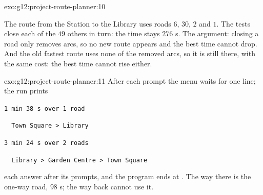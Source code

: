 \begin{solution}{exo:g12:project-route-planner:10}
\smallskip\noindent\hspace*{2em}

\noindent\hspace*{4em}

\noindent\hspace*{4em}

\noindent\hspace*{6em}

\noindent\hspace*{10em}

\noindent\hspace*{6em}

\noindent\hspace*{4em}

\smallskip\noindent The route from the Station to the Library uses roads $6$, $30$, $2$ and $1$. The tests close each
of the $49$ others in turn: the time stays $276$ s. The argument: closing a road only removes arcs, so no new route
appears and the best time cannot drop. And the old fastest route uses none of the removed arcs, so it is still there,
with the same cost: the best time cannot rise either.
\end{solution}

\begin{solution}{exo:g12:project-route-planner:11}
After each prompt the menu waits for one line; the run prints

\smallskip\noindent\hspace*{2em}\texttt{1 min 38 s over 1 road}

\noindent\hspace*{2em}\texttt{\ \ Town Square > Library}

\noindent\hspace*{2em}\texttt{3 min 24 s over 2 roads}

\noindent\hspace*{2em}\texttt{\ \ Library > Garden Centre > Town Square}

\smallskip\noindent each answer after its prompts, and the program ends at . The way there is the one-way
road, $98$ s; the way back cannot use it.
\end{solution}

